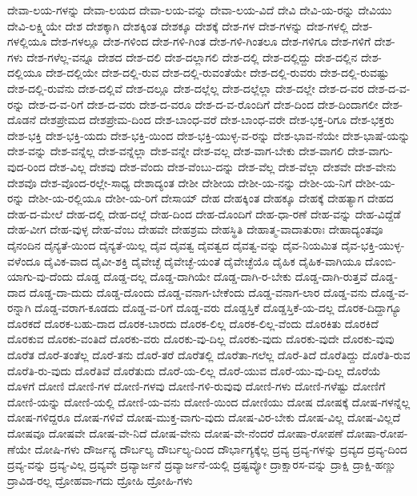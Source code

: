 {ದೇವಾ-ಲಯ-ಗಳನ್ನು
ದೇವಾ-ಲಯದ
ದೇವಾ-ಲಯ-ವನ್ನು
ದೇವಾ-ಲಯ-ವಿದೆ
ದೇವಿ
ದೇವಿ-ಯ-ರನ್ನು
ದೇವಿಯು
ದೇವಿ-ಲಕ್ಷ್ಮಿಯೇ
ದೇಶ
ದೇಶಕ್ಕಾಗಿ
ದೇಶಕ್ಕಿಂತ
ದೇಶಕ್ಕೂ
ದೇಶಕ್ಕೆ
ದೇಶ-ಗಳ
ದೇಶ-ಗಳನ್ನು
ದೇಶ-ಗಳಲ್ಲಿ
ದೇಶ-ಗಳಲ್ಲಿಯೂ
ದೇಶ-ಗಳಲ್ಲೂ
ದೇಶ-ಗಳಿಂದ
ದೇಶ-ಗಳಿ-ಗಿಂತ
ದೇಶ-ಗಳಿ-ಗಿಂತಲೂ
ದೇಶ-ಗಳಿಗೂ
ದೇಶ-ಗಳಿಗೆ
ದೇಶ-ಗಳು
ದೇಶ-ಗಳೆಲ್ಲ-ವನ್ನೂ
ದೇಶದ
ದೇಶ-ದಲಿ
ದೇಶ-ದಲ್ಲಾಗಲಿ
ದೇಶ-ದಲ್ಲಿ
ದೇಶ-ದಲ್ಲಿದ್ದು
ದೇಶ-ದಲ್ಲಿನ
ದೇಶ-ದಲ್ಲಿಯೂ
ದೇಶ-ದಲ್ಲಿಯೇ
ದೇಶ-ದಲ್ಲಿ-ರುವ
ದೇಶ-ದಲ್ಲಿ-ರುವಂತೆಯೇ
ದೇಶ-ದಲ್ಲಿ-ರುವರು
ದೇಶ-ದಲ್ಲಿ-ರುವಷ್ಟು
ದೇಶ-ದಲ್ಲಿ-ರುವೆನು
ದೇಶ-ದಲ್ಲಿವೆ
ದೇಶ-ದಲ್ಲೂ
ದೇಶ-ದಲ್ಲೆಲ್ಲ
ದೇಶ-ದಲ್ಲೆಲ್ಲಾ
ದೇಶ-ದಲ್ಲೇ
ದೇಶ-ದ-ವರ
ದೇಶ-ದ-ವ-ರನ್ನು
ದೇಶ-ದ-ವ-ರಿಗೆ
ದೇಶ-ದ-ವರು
ದೇಶ-ದ-ವರೂ
ದೇಶ-ದ-ವ-ರೊಂದಿಗೆ
ದೇಶ-ದಿಂದ
ದೇಶ-ದಿಂದಾಗಲೀ
ದೇಶ-ದೊಡನೆ
ದೇಶಪ್ರೇಮದ
ದೇಶಪ್ರೇಮ-ದಿಂದ
ದೇಶ-ಬಾಂಧ-ವರೆ
ದೇಶ-ಬಾಂಧ-ವರೇ
ದೇಶ-ಭಕ್ತ-ರಿಗೂ
ದೇಶ-ಭಕ್ತರು
ದೇಶ-ಭಕ್ತಿ
ದೇಶ-ಭಕ್ತಿ-ಯದು
ದೇಶ-ಭಕ್ತಿ-ಯಿಂದ
ದೇಶ-ಭಕ್ತಿ-ಯುಳ್ಳ-ವ-ರನ್ನು
ದೇಶ-ಭಾವ-ನೆಯೇ
ದೇಶ-ಭಾಷೆ-ಯನ್ನು
ದೇಶ-ವನ್ನು
ದೇಶ-ವನ್ನೆಲ್ಲ
ದೇಶ-ವನ್ನೆಲ್ಲಾ
ದೇಶ-ವನ್ನೇ
ದೇಶ-ವಲ್ಲ
ದೇಶ-ವಾಗ-ಬೇಕು
ದೇಶ-ವಾಗಲಿ
ದೇಶ-ವಾಗು-ವುದ-ರಿಂದ
ದೇಶ-ವಿಲ್ಲ
ದೇಶವು
ದೇಶ-ವೆಂದು
ದೇಶ-ವೆಂಬು-ದನ್ನು
ದೇಶ-ವೆಲ್ಲ
ದೇಶ-ವೆಲ್ಲಾ
ದೇಶವೇ
ದೇಶ-ವೇನು
ದೇಶವೊ
ದೇಶ-ವೊಂದ-ರಲ್ಲೇ-ಸಾಧ್ಯ
ದೇಶಾದ್ಯಂತ
ದೇಶೀ
ದೇಶೀಯ
ದೇಶೀ-ಯ-ನನ್ನು
ದೇಶೀ-ಯ-ನಿಗೆ
ದೇಶೀ-ಯ-ರನ್ನು
ದೇಶೀ-ಯ-ರಲ್ಲಿಯೂ
ದೇಶೀ-ಯ-ರಿಗೆ
ದೇಸಾಯ್
ದೇಹ
ದೇಹಕ್ಕಿಂತ
ದೇಹಕ್ಕೂ
ದೇಹಕ್ಕೆ
ದೇಹತ್ಯಾಗ
ದೇಹದ
ದೇಹ-ದ-ಮೇಲೆ
ದೇಹ-ದಲ್ಲಿ
ದೇಹ-ದಲ್ಲೆ
ದೇಹ-ದಿಂದ
ದೇಹ-ದೊಂದಿಗೆ
ದೇಹ-ಧಾ-ರಣೆ
ದೇಹ-ವನ್ನು
ದೇಹ-ವಿದ್ದೆಡೆ
ದೇಹ-ವೀಗ
ದೇಹ-ವುಳ್ಳ
ದೇಹ-ವೆಂಬ
ದೇಹವೇ
ದೇಹಶ್ರಮ
ದೇಹಸ್ಥಿತಿ
ದೇಹಾತ್ಮ-ವಾದಾತುರಾಃ
ದೇಹಾದ್ಯಂತವೂ
ದೈನಂದಿನ
ದೈನ್ಯತೆ-ಯಿಂದ
ದೈನ್ಯತೆ-ಯಿಲ್ಲ
ದೈವ
ದೈವತ್ವ
ದೈವತ್ವದ
ದೈವತ್ವ-ವನ್ನು
ದೈವ-ನಿಯಮಿತ
ದೈವ-ಭಕ್ತಿ-ಯುಳ್ಳ-ವಳೆಂದೂ
ದೈವಿಕ-ವಾದ
ದೈವೀ-ಶಕ್ತಿ
ದೈವೇಚ್ಛೆ
ದೈವೇಚ್ಛೆ-ಯಂತೆ
ದೈವೇಚ್ಛೆಯೊ
ದೈಹಿಕ
ದೈಹಿಕ-ವಾಗಿಯೂ
ದೊಂಬಿ-ಯಾಗು-ವು-ದೆಂದು
ದೊಡ್ಡ
ದೊಡ್ಡ-ದಲ್ಲ
ದೊಡ್ಡ-ದಾಗಿಯೇ
ದೊಡ್ಡ-ದಾಗಿ-ರ-ಬೇಕು
ದೊಡ್ಡ-ದಾಗಿ-ರುತ್ತವೆ
ದೊಡ್ಡ-ದಾದ
ದೊಡ್ಡ-ದಾ-ದುದು
ದೊಡ್ಡ-ದೊಂದು
ದೊಡ್ಡ-ವನಾಗ-ಬೇಕೆಂದು
ದೊಡ್ಡ-ವನಾಗ-ಲಾರ
ದೊಡ್ಡ-ವನು
ದೊಡ್ಡ-ವ-ರನ್ನಾಗಿ
ದೊಡ್ಡ-ವರಾಗ-ಕೂಡದು
ದೊಡ್ಡ-ವ-ರಿಗೆ
ದೊಡ್ಡ-ವರು
ದೊಡ್ಡಸ್ತಿಕೆ
ದೊಡ್ಡಸ್ತಿಕೆ-ಯ-ದಲ್ಲ
ದೊರಕ-ದಿದ್ದಾಗ್ಯೂ
ದೊರಕದೆ
ದೊರಕ-ಬಹು-ದಾದ
ದೊರಕ-ಬಾರದು
ದೊರಕ-ಲಿಲ್ಲ
ದೊರಕ-ಲಿಲ್ಲ-ವೆಂದು
ದೊರಕಿತು
ದೊರಕಿದೆ
ದೊರಕುವ
ದೊರಕು-ವಂತಿದೆ
ದೊರಕು-ವರು
ದೊರಕು-ವು-ದಿಲ್ಲ
ದೊರಕು-ವುದು
ದೊರಕು-ವುದೇ
ದೊರಕು-ವುವು
ದೊರೆತ
ದೊರೆ-ತಂತೆಲ್ಲ
ದೊರೆ-ತನು
ದೊರೆ-ತರೆ
ದೊರೆತಲ್ಲಿ
ದೊರೆತಾ-ಗಲೆಲ್ಲ
ದೊರೆ-ತಿದೆ
ದೊರೆತಿದ್ದು
ದೊರೆತಿ-ರುವ
ದೊರೆತಿ-ರು-ವುದು
ದೊರೆತಿವೆ
ದೊರೆತುದು
ದೊರೆ-ಯ-ಲಿಲ್ಲ
ದೊರೆ-ಯುವ
ದೊರೆ-ಯು-ವು-ದಿಲ್ಲ
ದೊರೆಯೆ
ದೊಳಗೆ
ದೋಣಿ
ದೋಣಿ-ಗಳ
ದೋಣಿ-ಗಳವು
ದೋಣಿ-ಗಳಿ-ರುವುವು
ದೋಣಿ-ಗಳು
ದೋಣಿ-ಗಳೆಷ್ಟು
ದೋಣಿಗೆ
ದೋಣಿ-ಯನ್ನು
ದೋಣಿ-ಯಲ್ಲಿ
ದೋಣಿ-ಯ-ವನು
ದೋಣಿ-ಯಿಂದ
ದೋಣಿಯು
ದೋಷ
ದೋಷಕ್ಕೆ
ದೋಷ-ಗಳನ್ನೆಲ್ಲ
ದೋಷ-ಗಳಿದ್ದರೂ
ದೋಷ-ಗಳಿವೆ
ದೋಷ-ಮುಕ್ತ-ವಾಗು-ವುದು
ದೋಷ-ವಿರ-ಬೇಕು
ದೋಷ-ವಿಲ್ಲ
ದೋಷ-ವಿಲ್ಲದೆ
ದೋಷವೂ
ದೋಷವೇ
ದೋಷ-ವೇ-ನಿದೆ
ದೋಷ-ವೇನು
ದೋಷ-ವೇ-ನೆಂದರೆ
ದೋಷಾ-ರೋಪಣೆ
ದೋಷಾ-ರೋಪ-ಣೆಯೇ
ದೋಷಿ-ಗಳು
ದೌರ್ಜನ್ಯ
ದೌರ್ಬಲ್ಯ
ದೌರ್ಬಲ್ಯ-ದಿಂದ
ದೌರ್ಭಾಗ್ಯಕ್ಕೆಲ್ಲ
ದ್ರವ್ಯ
ದ್ರವ್ಯ-ಗಳನ್ನು
ದ್ರವ್ಯದ
ದ್ರವ್ಯ-ದಿಂದ
ದ್ರವ್ಯ-ವನ್ನು
ದ್ರವ್ಯ-ವಿಲ್ಲ
ದ್ರವ್ಯವೇ
ದ್ರವ್ಯಾರ್ಜನೆ
ದ್ರವ್ಯಾರ್ಜನೆ-ಯಲ್ಲಿ
ದ್ರಷ್ಟವ್ಯೋ
ದ್ರಾಕ್ಷಾರಸ-ವನ್ನು
ದ್ರಾಕ್ಷಿ
ದ್ರಾಕ್ಷಿ-ಹಣ್ಣು
ದ್ರಾವಿಡ-ರಲ್ಲ
ದ್ರೋಹವಾ-ಗದು
ದ್ರೋಹಿ
ದ್ರೋಹಿ-ಗಳು
}
